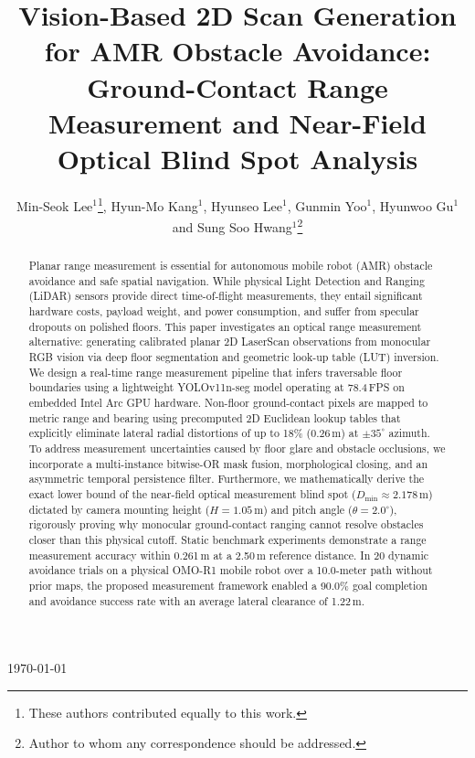 \documentclass[12pt]{iopart}
\begin{document}
\title[Vision-Based 2D Scan Generation for AMR Obstacle Avoidance]{Vision-Based 2D Scan Generation for AMR Obstacle Avoidance: Ground-Contact Range Measurement and Near-Field Optical Blind Spot Analysis}

\author{Min-Seok Lee$^1$\footnote{These authors contributed equally to this work.}, Hyun-Mo Kang$^1$\footnotemark[1], Hyunseo Lee$^1$, Gunmin Yoo$^1$, Hyunwoo Gu$^1$ and Sung Soo Hwang$^1$\footnote{Author to whom any correspondence should be addressed.}}

\address{$^1$ School of Artificial Intelligence, Computer and Electrical Engineering, Handong Global University, 558 Handong-ro, Buk-gu, Pohang, Gyeongbuk 37554, Republic of Korea}

\vspace{10pt}
\begin{indented}
\item[]\today
\end{indented}

\begin{abstract}
Planar range measurement is essential for autonomous mobile robot (AMR) obstacle avoidance and safe spatial navigation. While physical Light Detection and Ranging (LiDAR) sensors provide direct time-of-flight measurements, they entail significant hardware costs, payload weight, and power consumption, and suffer from specular dropouts on polished floors. This paper investigates an optical range measurement alternative: generating calibrated planar 2D LaserScan observations from monocular RGB vision via deep floor segmentation and geometric look-up table (LUT) inversion. We design a real-time range measurement pipeline that infers traversable floor boundaries using a lightweight YOLOv11n-seg model operating at 78.4\,FPS on embedded Intel Arc GPU hardware. Non-floor ground-contact pixels are mapped to metric range and bearing using precomputed 2D Euclidean lookup tables that explicitly eliminate lateral radial distortions of up to 18\% (0.26\,m) at $\pm35^\circ$ azimuth. To address measurement uncertainties caused by floor glare and obstacle occlusions, we incorporate a multi-instance bitwise-OR mask fusion, morphological closing, and an asymmetric temporal persistence filter. Furthermore, we mathematically derive the exact lower bound of the near-field optical measurement blind spot ($D_{\min} \approx 2.178$\,m) dictated by camera mounting height ($H=1.05$\,m) and pitch angle ($\theta=2.0^\circ$), rigorously proving why monocular ground-contact ranging cannot resolve obstacles closer than this physical cutoff. Static benchmark experiments demonstrate a range measurement accuracy within 0.261\,m at a 2.50\,m reference distance. In 20 dynamic avoidance trials on a physical OMO-R1 mobile robot over a 10.0-meter path without prior maps, the proposed measurement framework enabled a 90.0\% goal completion and avoidance success rate with an average lateral clearance of 1.22\,m.
\end{abstract}
\end{document}
